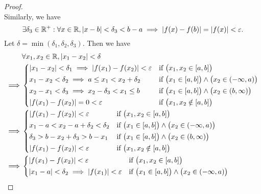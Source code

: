 \begin{proof}
\[  \]
  Similarly, we have
  \[
    \exists \delta_3 \in \mathbb{R}^+ : \forall x \in \mathbb{R}, \left\lvert x - b\right\rvert < \delta_3 < b - a \implies \left\lvert f(x) - f(b)\right\rvert = \left\lvert f(x)\right\rvert < \varepsilon.
  \]
  Let \(\delta = \min(\delta_1, \delta_2, \delta_3)\).
  Then we have
  \begin{align*}
             & \forall x_1, x_2 \in \R, \abs{x_1 - x_2} < \delta                                                                                                          \\
    \implies & \begin{dcases}
                 \abs{x_1 - x_2} < \delta_1 \implies \abs{f(x_1) - f(x_2)} < \varepsilon & \text{if } \big(x_1, x_2 \in [a, b]\big)                                 \\
                 x_1 - x_2 < \delta_2 \implies a \leq x_1 < x_2 + \delta_2               & \text{if } \big(x_1 \in [a, b]\big) \land \big(x_2 \in (-\infty, a)\big) \\
                 x_2 - x_1 < \delta_3 \implies x_2 - \delta_3 < x_1 \leq b               & \text{if } \big(x_1 \in [a, b]\big) \land \big(x_2 \in (b, \infty)\big)  \\
                 \abs{f(x_1) - f(x_2)} = 0 < \varepsilon                                 & \text{if } \big(x_1, x_2 \notin [a, b]\big)
               \end{dcases} \\
    \implies & \begin{dcases}
                 \abs{f(x_1) - f(x_2)} < \varepsilon     & \text{if } \big(x_1, x_2 \in [a, b]\big)                                 \\
                 x_1 - a < x_2 - a + \delta_2 < \delta_2 & \text{if } \big(x_1 \in [a, b]\big) \land \big(x_2 \in (-\infty, a)\big) \\
                 \delta_3 > b - x_2 + \delta_3 > b - x_1 & \text{if } \big(x_1 \in [a, b]\big) \land \big(x_2 \in (b, \infty)\big)  \\
                 \abs{f(x_1) - f(x_2)} < \varepsilon     & \text{if } \big(x_1, x_2 \notin [a, b]\big)
               \end{dcases}                                 \\
    \implies & \begin{dcases}
                 \abs{f(x_1) - f(x_2)} < \varepsilon                          & \text{if } \big(x_1, x_2 \in [a, b]\big)                                 \\
                 \abs{x_1 - a} < \delta_2 \implies \abs{f(x_1)} < \varepsilon & \text{if } \big(x_1 \in [a, b]\big) \land \big(x_2 \in (-\infty, a)\big) \\

\end{dcases}
\end{align*}
\end{proof}
